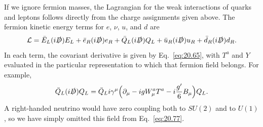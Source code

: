 If we ignore fermion masses, the Lagrangian for the weak interactions of
quarks and leptons follows directly from the charge assignments given above.
The fermion kinetic energy terms for $e$, $\nu$, $u$, and $d$ are
\begin{equation}
  \mathcal{L} = \bar{E}_L(i\slashed{D})E_L + \bar{e}_R(i\slashed{D})e_R
    + \bar{Q}_L(i\slashed{D})Q_L + \bar{u}_R(i\slashed{D})u_R
    + \bar{d}_R(i\slashed{D})d_R .
  \label{eq:20.77}
\end{equation}
In each term, the covariant derivative is given by Eq.~\eqref{eq:20.65}, with
$T^a$ and $Y$ evaluated in the particular representation to which that
fermion field belongs.  For example,
\begin{equation}
  \bar{Q}_L(i\slashed{D})Q_L = \bar{Q}_L i\gamma^\mu\Bigl( \partial_\mu
    - igW^a_\mu T^a - i\frac{g'}{6}B_\mu \Bigr)Q_L .
  \label{eq:20.78}
\end{equation}
A right-handed neutrino would have zero coupling both to $SU(2)$ and to
$U(1)$, so we have simply omitted this field from Eq.~\eqref{eq:20.77}.

